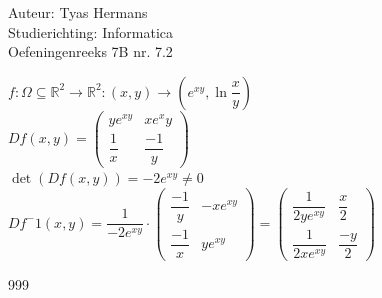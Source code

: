 \documentclass[a4paper]{article}
\begin{document}
  
\noindent \large Auteur: Tyas Hermans \\
\noindent \large Studierichting: Informatica\\
\noindent \large Oefeningenreeks 7B nr. 7.2\\

\medskip

\normalsize

$f:\Omega\subseteq\mathbb{R}^2\rightarrow\mathbb{R}^2: (x,y) \rightarrow \left(e^{xy}, \ln\dfrac{x}{y}\right)$\\

$Df(x,y) = \left(
\begin{array}{cc}
ye^{xy} & xe^xy\\
\dfrac{1}{x} & \dfrac{-1}{y}
\end{array}
\right)$\\

$\det( Df(x,y)) = -2e^{xy} \neq 0$\\

$Df^-1(x,y) = \dfrac{1}{-2e^{xy}}\cdot \left(
\begin{array}{cc}
\dfrac{-1}{y}  & -xe^{xy}\\
\dfrac{-1}{x} & ye^{xy}
\end{array}
\right) = \left(
\begin{array}{cc}
\dfrac{1}{2ye^{xy}}  & \dfrac{x}{2}\\
\dfrac{1}{2xe^{xy}} & \dfrac{-y}{2}
\end{array}
\right)$\\


\begin{thebibliography}{999}
\end{thebibliography}
\end{document}
